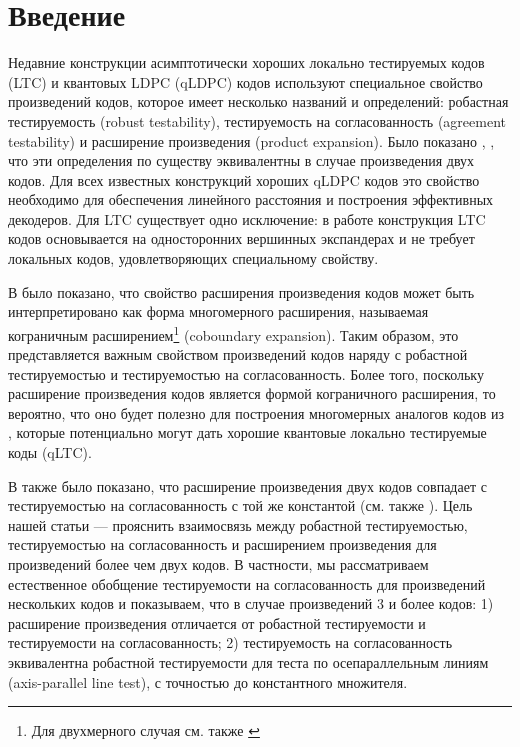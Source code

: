 \documentclass[russian]{intsys}
\begin{document}
\section{Введение}
Недавние конструкции асимптотически хороших локально тестируемых кодов (LTC) и квантовых LDPC (qLDPC) кодов \cite{Panteleev&Kalachev:stoc2022,Dinur:stoc2022,Dinur:decoders,Leverrier:focs2022,Leverrier:qldpcdecoder:2023,Leverrier:2023,Gu:stoc2023:qpdpc-decoder} используют специальное свойство произведений кодов, которое имеет несколько названий и определений: робастная тестируемость (robust testability), тестируемость на согласованность (agreement testability) и расширение произведения (product expansion). Было показано \cite[Lemma 2.9]{Dinur:stoc2022}, \cite[Lemma 1]{PK2022robust}, что эти определения по существу эквивалентны в случае произведения двух кодов. Для всех известных конструкций хороших qLDPC кодов это свойство необходимо для обеспечения линейного расстояния и построения эффективных декодеров. Для LTC существует одно исключение: в работе \cite{Lin2022:losslessLTC} конструкция LTC кодов основывается на односторонних вершинных экспандерах и не требует локальных кодов, удовлетворяющих специальному свойству.

В \cite[Appendix B]{PK2022robust} было показано, что свойство расширения произведения кодов может быть интерпретировано как форма многомерного расширения, называемая кограничным расширением\footnote{Для двухмерного случая см. также \cite[Section 2.6]{Dinur:decoders}} (coboundary expansion). Таким образом, это представляется важным свойством произведений кодов наряду с робастной тестируемостью и тестируемостью на согласованность. Более того, поскольку расширение произведения кодов является формой кограничного расширения, то вероятно, что оно будет полезно для построения многомерных аналогов кодов из \cite{Dinur:stoc2022,Panteleev&Kalachev:stoc2022}, которые потенциально могут дать хорошие квантовые локально тестируемые коды (qLTC).

В \cite[Lemma 1]{PK2022robust} также было показано, что расширение произведения двух кодов совпадает с тестируемостью на согласованность с той же константой (см. также \cite[Section 2.6]{Dinur:decoders}).
Цель нашей статьи --- прояснить взаимосвязь между робастной тестируемостью, тестируемостью на согласованность и расширением произведения для произведений более чем двух кодов.
В частности, мы рассматриваем естественное обобщение тестируемости на согласованность для произведений нескольких кодов и показываем, что в случае произведений 3 и более кодов: 1) расширение произведения отличается от робастной тестируемости и тестируемости на согласованность; 2) тестируемость на согласованность эквивалентна робастной тестируемости для теста по осепараллельным линиям (axis-parallel line test), с точностью до константного множителя.
\end{document}
